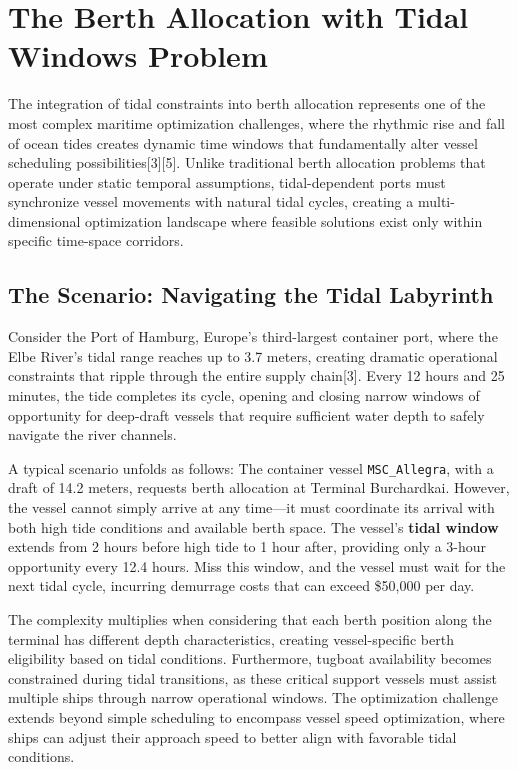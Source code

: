 \documentclass{article}
\begin{document}
\section{The Berth Allocation with Tidal Windows Problem}

The integration of tidal constraints into berth allocation represents one of the most complex maritime optimization challenges, where the rhythmic rise and fall of ocean tides creates dynamic time windows that fundamentally alter vessel scheduling possibilities[3][5]. Unlike traditional berth allocation problems that operate under static temporal assumptions, tidal-dependent ports must synchronize vessel movements with natural tidal cycles, creating a multi-dimensional optimization landscape where feasible solutions exist only within specific time-space corridors.

\subsection{The Scenario: Navigating the Tidal Labyrinth}

Consider the Port of Hamburg, Europe's third-largest container port, where the Elbe River's tidal range reaches up to 3.7 meters, creating dramatic operational constraints that ripple through the entire supply chain[3]. Every 12 hours and 25 minutes, the tide completes its cycle, opening and closing narrow windows of opportunity for deep-draft vessels that require sufficient water depth to safely navigate the river channels.

A typical scenario unfolds as follows: The container vessel \texttt{MSC\_Allegra}, with a draft of 14.2 meters, requests berth allocation at Terminal Burchardkai. However, the vessel cannot simply arrive at any time—it must coordinate its arrival with both high tide conditions and available berth space. The vessel's \textbf{tidal window} extends from 2 hours before high tide to 1 hour after, providing only a 3-hour opportunity every 12.4 hours. Miss this window, and the vessel must wait for the next tidal cycle, incurring demurrage costs that can exceed \$50,000 per day.

The complexity multiplies when considering that each berth position along the terminal has different depth characteristics, creating vessel-specific berth eligibility based on tidal conditions. Furthermore, tugboat availability becomes constrained during tidal transitions, as these critical support vessels must assist multiple ships through narrow operational windows. The optimization challenge extends beyond simple scheduling to encompass vessel speed optimization, where ships can adjust their approach speed to better align with favorable tidal conditions.
\end{document}
